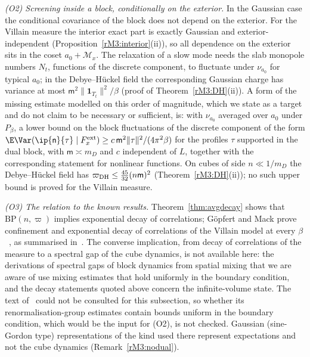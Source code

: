 \emph{(O2) Screening inside a block, conditionally on the exterior.} In the
Gaussian case the conditional covariance of the block does not depend on
the exterior. For the Villain measure the interior exact part is exactly
Gaussian and exterior-independent (Proposition~\ref{rM3:interior}(ii)),
so all dependence on the exterior sits in the coset $a_0+\mathcal M_x$.
The relaxation of a slow mode needs the slab monopole numbers $N_t$,
functions of the discrete component, to fluctuate under $\nu_{a_0}$ for
typical $a_0$; in the Debye--H\"uckel field the corresponding Gaussian
charge has variance at most $\mathsf m^2\lVert\mathbf 1_{T_t}\rVert^2/\beta$
(proof of Theorem~\ref{rM3:DH}(ii)). A form of the missing estimate
modelled on this order of magnitude, which we state as a target and do
not claim to be necessary or sufficient, is: with $\nu_{a_0}$ averaged over $a_0$ under $P_\beta$, a lower bound on the
block fluctuations of the discrete component of the form
$\E\Var(\ip{\mathsf n}{\tau}\mid F^{\rm ext}_x)\ge c\,\mathsf m^2\lVert\tau
\rVert^2/(4\pi^2\beta)$ for the profiles $\tau$ supported in the dual block,
with $\mathsf m\asymp m_D$ and $c$ independent of $L$, together with the
corresponding statement for nonlinear functions. On cubes of side $n\ll
1/m_D$ the Debye--H\"uckel field has $\varpi_{\rm DH}\le\frac{45}{32}
(n\mathsf m)^2$ (Theorem~\ref{rM3:DH}(ii)); no such upper bound is proved
for the Villain measure.

\emph{(O3) The relation to the known results.} Theorem~\ref{thm:avgdecay}
shows that $\mathrm{BP}(n,\varpi)$ implies exponential decay of
correlations; G\"opfert and Mack prove confinement and exponential decay
of correlations of the Villain model at every $\beta$~\cite{GM82}, as
summarised in~\cite{Cha18,RFN24}. The converse implication, from decay of
correlations of the measure to a spectral gap of the cube dynamics, is not
available here: the derivations of spectral gaps of block dynamics from
spatial mixing that we are aware of use mixing estimates that hold uniformly
in the boundary condition, and the decay statements quoted above concern
the infinite-volume state. The text of~\cite{GM82} could not be consulted
for this subsection, so whether its renormalisation-group estimates
contain bounds uniform in the boundary condition, which would be the input
for (O2), is not checked. Gaussian (sine-Gordon type) representations of
the kind used there represent expectations and not the cube dynamics
(Remark~\ref{rM3:nodual}).

